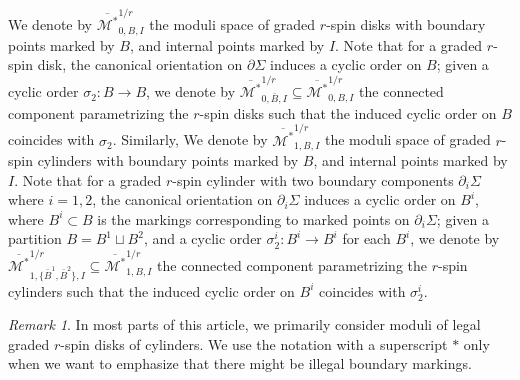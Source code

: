 \documentclass[11pt]{amsart}
\theoremstyle{definition}
\theoremstyle{remark}
\newtheorem{rmk}[dummy]{Remark}
\newcommand{\<}{\left<}
\renewcommand{\>}{\right>}
\numberwithin{equation}{section}
\def\Mbarstar{{\overline{\mathcal M^*}}}
\begin{document}
We denote by $\Mbarstar_{0,B,I}^{1/r}$ the moduli space of graded $r$-spin disks with boundary points marked by $B$, and internal points marked by $I$. Note that for a graded $r$-spin disk, the canonical orientation on $\partial\Sigma$ induces a cyclic order on $B$; given a cyclic order $\sigma_2\colon B \to B$, we denote by $\Mbarstar_{0,\bar{B},I}^{1/r}\subseteq \Mbarstar_{0,{B},I}^{1/r}$ the connected component parametrizing the $r$-spin disks such that the induced cyclic order on $B$ coincides with $\sigma_2$. 
Similarly, We denote by $\Mbarstar_{1,B,I}^{1/r}$ the moduli space of graded $r$-spin cylinders with boundary points marked by $B$, and internal points marked by $I$. Note that for a graded $r$-spin cylinder with two boundary components $\partial_i\Sigma$ where $i=1,2$, the canonical orientation on $\partial_i\Sigma$ induces a cyclic order on $B^i$, where $B^i\subset B$ is the markings corresponding to marked points on $\partial_i\Sigma$; given a partition %
$B=B^1\sqcup B^2$, and %
a cyclic order $\sigma_2^i\colon B^i \to B^i$ for each $B^i$, we denote by $\Mbarstar_{1,\{\bar{B}^1,\bar B^2\},I}^{1/r}\subseteq \Mbarstar_{1,{B},I}^{1/r}$ the connected component parametrizing the $r$-spin cylinders such that the induced cyclic order on $B^i$ coincides with $\sigma^i_2$. 


\begin{rmk}
   In most parts of this article, we primarily consider moduli of legal graded $r$-spin disks of cylinders. We use the notation with a %
superscript $*$ only %
when we want to emphasize that there might be illegal boundary markings. 
\end{rmk}
\end{document}

